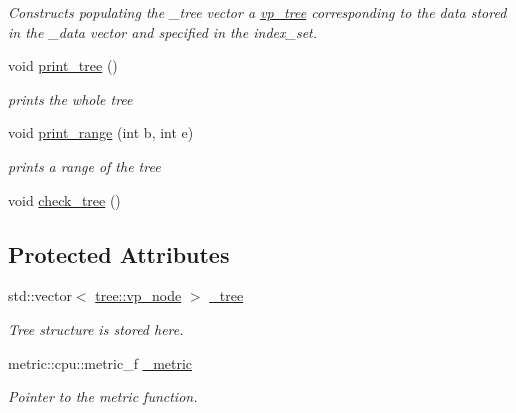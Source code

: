 \begin{DoxyCompactItemize}
\begin{DoxyCompactList}\small\item\em Constructs populating the \+\_\+tree vector a \hyperlink{classtree_1_1cpu_1_1vp__tree}{vp\+\_\+tree} corresponding to the data stored in the \+\_\+data vector and specified in the index\+\_\+set. \end{DoxyCompactList}\item 
\hypertarget{classtree_1_1cpu_1_1vp__tree_a2ce12f56df286265f5774cd7ed6591cf}{}void \hyperlink{classtree_1_1cpu_1_1vp__tree_a2ce12f56df286265f5774cd7ed6591cf}{print\+\_\+tree} ()\label{classtree_1_1cpu_1_1vp__tree_a2ce12f56df286265f5774cd7ed6591cf}

\begin{DoxyCompactList}\small\item\em prints the whole tree \end{DoxyCompactList}\item 
\hypertarget{classtree_1_1cpu_1_1vp__tree_a5d2affdc5daf2e8ad4d30fe99c7fe9ee}{}void \hyperlink{classtree_1_1cpu_1_1vp__tree_a5d2affdc5daf2e8ad4d30fe99c7fe9ee}{print\+\_\+range} (int b, int e)\label{classtree_1_1cpu_1_1vp__tree_a5d2affdc5daf2e8ad4d30fe99c7fe9ee}

\begin{DoxyCompactList}\small\item\em prints a range of the tree \end{DoxyCompactList}\item 
void \hyperlink{classtree_1_1cpu_1_1vp__tree_addb1a27773443a133c15c75309de3ee8}{check\+\_\+tree} ()
\end{DoxyCompactItemize}
\subsection*{Protected Attributes}
\begin{DoxyCompactItemize}
\item 
std\+::vector$<$ \hyperlink{structtree_1_1vp__node__t}{tree\+::vp\+\_\+node} $>$ \hyperlink{classtree_1_1cpu_1_1vp__tree_ac5173f60c5365b1b878001822a6aa194}{\+\_\+tree}
\begin{DoxyCompactList}\small\item\em Tree structure is stored here. \end{DoxyCompactList}\item 
metric\+::cpu\+::metric\+\_\+f \hyperlink{classtree_1_1cpu_1_1vp__tree_a5ad0a08e0bcc66466e24485f46671a21}{\+\_\+metric}
\begin{DoxyCompactList}\small\item\em Pointer to the metric function. \end{DoxyCompactList}\end{DoxyCompactItemize}


